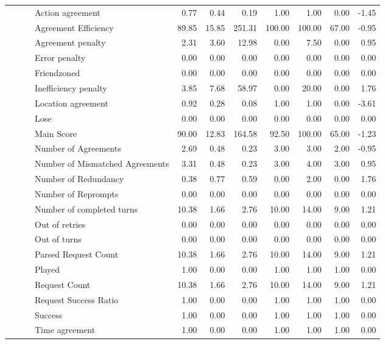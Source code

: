 \begin{tabular}{llllrrrrrrr}
 &  &  & Action agreement & 0.77 & 0.44 & 0.19 & 1.00 & 1.00 & 0.00 & -1.45 \\
 &  &  & Agreement Efficiency & 89.85 & 15.85 & 251.31 & 100.00 & 100.00 & 67.00 & -0.95 \\
 &  &  & Agreement penalty & 2.31 & 3.60 & 12.98 & 0.00 & 7.50 & 0.00 & 0.95 \\
 &  &  & Error penalty & 0.00 & 0.00 & 0.00 & 0.00 & 0.00 & 0.00 & 0.00 \\
 &  &  & Friendzoned & 0.00 & 0.00 & 0.00 & 0.00 & 0.00 & 0.00 & 0.00 \\
 &  &  & Inefficiency penalty & 3.85 & 7.68 & 58.97 & 0.00 & 20.00 & 0.00 & 1.76 \\
 &  &  & Location agreement & 0.92 & 0.28 & 0.08 & 1.00 & 1.00 & 0.00 & -3.61 \\
 &  &  & Lose & 0.00 & 0.00 & 0.00 & 0.00 & 0.00 & 0.00 & 0.00 \\
 &  &  & Main Score & 90.00 & 12.83 & 164.58 & 92.50 & 100.00 & 65.00 & -1.23 \\
 &  &  & Number of Agreements & 2.69 & 0.48 & 0.23 & 3.00 & 3.00 & 2.00 & -0.95 \\
 &  &  & Number of Mismatched Agreements & 3.31 & 0.48 & 0.23 & 3.00 & 4.00 & 3.00 & 0.95 \\
 &  &  & Number of Redundancy & 0.38 & 0.77 & 0.59 & 0.00 & 2.00 & 0.00 & 1.76 \\
 &  &  & Number of Reprompts & 0.00 & 0.00 & 0.00 & 0.00 & 0.00 & 0.00 & 0.00 \\
 &  &  & Number of completed turns & 10.38 & 1.66 & 2.76 & 10.00 & 14.00 & 9.00 & 1.21 \\
 &  &  & Out of retries & 0.00 & 0.00 & 0.00 & 0.00 & 0.00 & 0.00 & 0.00 \\
 &  &  & Out of turns & 0.00 & 0.00 & 0.00 & 0.00 & 0.00 & 0.00 & 0.00 \\
 &  &  & Parsed Request Count & 10.38 & 1.66 & 2.76 & 10.00 & 14.00 & 9.00 & 1.21 \\
 &  &  & Played & 1.00 & 0.00 & 0.00 & 1.00 & 1.00 & 1.00 & 0.00 \\
 &  &  & Request Count & 10.38 & 1.66 & 2.76 & 10.00 & 14.00 & 9.00 & 1.21 \\
 &  &  & Request Success Ratio & 1.00 & 0.00 & 0.00 & 1.00 & 1.00 & 1.00 & 0.00 \\
 &  &  & Success & 1.00 & 0.00 & 0.00 & 1.00 & 1.00 & 1.00 & 0.00 \\
 &  &  & Time agreement & 1.00 & 0.00 & 0.00 & 1.00 & 1.00 & 1.00 & 0.00 \\

\end{tabular}

